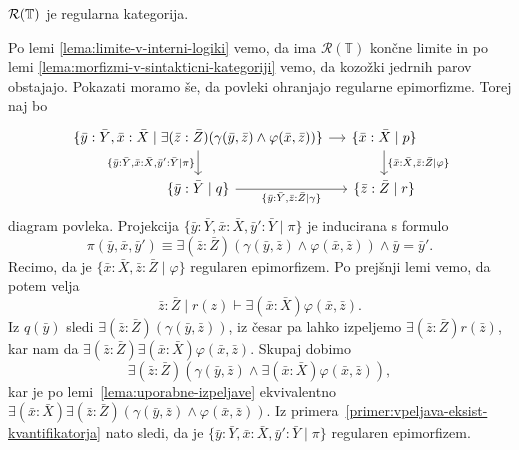 \documentclass[../kategoricna_logika.tex]{subfiles}
\begin{document}
\begin{trditev}
  $\mathcal{R}(\mathbb{T})$ je regularna kategorija.
\end{trditev}
\begin{dokaz}
  Po lemi \ref{lema:limite-v-interni-logiki} vemo, da ima
  $\mathcal{R}(\mathbb{T})$ končne limite in po lemi
  \ref{lema:morfizmi-v-sintakticni-kategoriji} vemo, da kozožki
  jedrnih parov obstajajo. Pokazati moramo še, da povleki ohranjajo
  regularne epimorfizme.  Torej naj bo
  \begin{equation*}
    \begin{tikzcd}[column sep=small]
      \{\bar{y}:\bar{Y},\bar{x}:\bar{X} \mid \exists (\bar{z}:\bar{Z})(\gamma(\bar{y},\bar{z}) \land \varphi(\bar{x},\bar{z}))\} \ar[d, "{\{\bar{y}:\bar{Y},\bar{x}:\bar{X},\bar{y}':\bar{Y} \mid \pi\}}"'] \ar[r] &
      \{ \bar{x}:\bar{X} \mid p\} \ar[d, "{\{\bar{x}:\bar{X}, \bar{z}:\bar{Z} \mid \varphi\}}"] \\
      \{\bar{y}:\bar{Y} \mid q\} \ar[r, "{\{\bar{y}:\bar{Y}, \bar{z}:\bar{Z} \mid \gamma\}}"'] & \{\bar{z}:\bar{Z} \mid r\}
    \end{tikzcd}
  \end{equation*}
  diagram povleka. Projekcija $\{\bar{y}:\bar{Y},\bar{x}:\bar{X},\bar{y}':\bar{Y} \mid \pi\}$
  je inducirana s formulo
  \[ \pi(\bar{y},\bar{x},\bar{y}') \equiv \exists (\bar{z}:\bar{Z})(\gamma(\bar{y},\bar{z}) \land \varphi(\bar{x},\bar{z}))\land \bar{y}=\bar{y}'.\]
  Recimo, da je $\{\bar{x}:\bar{X}, \bar{z}:\bar{Z} \mid \varphi\}$ regularen
  epimorfizem. Po prejšnji lemi vemo, da potem velja
  $$\bar{z}:\bar{Z} \mid r(z) \vdash \exists (\bar{x}:\bar{X} ) \varphi(\bar{x},\bar{z}).$$
  Iz
  $q(\bar{y})$ sledi $\exists (\bar{z}:\bar{Z})(\gamma(\bar{y},\bar{z}))$, iz česar pa lahko izpeljemo
  $\exists (\bar{z}:\bar{Z}) r(\bar{z})$, kar nam da $\exists (\bar{z}:\bar{Z}) \exists (\bar{x}:\bar{X} )
  \varphi(\bar{x},\bar{z})$. Skupaj dobimo
  \[ \exists (\bar{z}:\bar{Z})(\gamma(\bar{y},\bar{z}) \land \exists (\bar{x}:\bar{X} ) \varphi(\bar{x},\bar{z})),\]
  kar je po lemi~\ref{lema:uporabne-izpeljave} ekvivalentno
  $\exists (\bar{x}:\bar{X} ) \exists (\bar{z}:\bar{Z})(\gamma(\bar{y},\bar{z}) \land \varphi(\bar{x},\bar{z}))$.
  Iz primera~\ref{primer:vpeljava-eksist-kvantifikatorja} nato sledi, da je
  $\{\bar{y}:\bar{Y},\bar{x}:\bar{X},\bar{y}':\bar{Y} \mid \pi\}$ regularen epimorfizem.
\end{dokaz}
\end{document}
